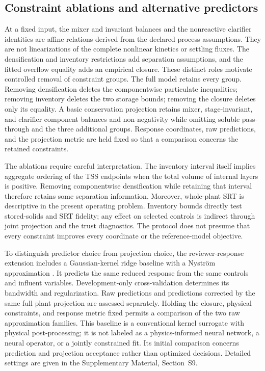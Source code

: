 \documentclass[a4paper,fleqn]{cas-sc}
\begin{document}
\subsection{Constraint ablations and alternative predictors}

At a fixed input, the mixer and invariant balances and the nonreactive clarifier identities are affine relations derived from the declared process assumptions. They are not linearizations of the complete nonlinear kinetics or settling fluxes. The densification and inventory restrictions add separation assumptions, and the fitted overflow equality adds an empirical closure. These distinct roles motivate controlled removal of constraint groups. The full model retains every group. Removing densification deletes the componentwise particulate inequalities; removing inventory deletes the two storage bounds; removing the closure deletes only its equality. A basic conservation projection retains mixer, stage-invariant, and clarifier component balances and non-negativity while omitting soluble pass-through and the three additional groups. Response coordinates, raw predictions, and the projection metric are held fixed so that a comparison concerns the retained constraints.

The ablations require careful interpretation. The inventory interval itself implies aggregate ordering of the TSS endpoints when the total volume of internal layers is positive. Removing componentwise densification while retaining that interval therefore retains some separation information. Moreover, whole-plant SRT is descriptive in the present operating problem. Inventory bounds directly test stored-solids and SRT fidelity; any effect on selected controls is indirect through joint projection and the trust diagnostics. The protocol does not presume that every constraint improves every coordinate or the reference-model objective.

To distinguish predictor choice from projection choice, the reviewer-response extension includes a Gaussian-kernel ridge baseline with a Nystr\"om approximation \citep{WilliamsSeeger2001}. It predicts the same reduced response from the same controls and influent variables. Development-only cross-validation determines its bandwidth and regularization. Raw predictions and predictions corrected by the same full plant projection are assessed separately. Holding the closure, physical constraints, and response metric fixed permits a comparison of the two raw approximation families. This baseline is a conventional kernel surrogate with physical post-processing; it is not labeled as a physics-informed neural network, a neural operator, or a jointly constrained fit. Its initial comparison concerns prediction and projection acceptance rather than optimized decisions. Detailed settings are given in the Supplementary Material, Section~S9.
\end{document}
